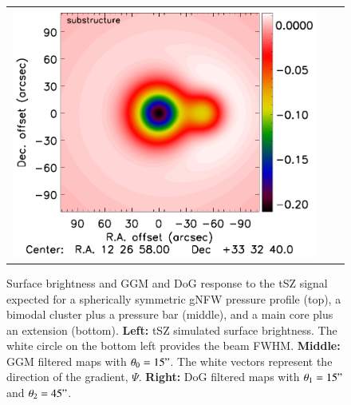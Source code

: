 \documentclass[traditabstract]{aa}
\begin{document}
\begin{figure}[h]
{\begin{tabular}{lll}
\includegraphics[trim=2.3cm 0.7cm 0cm 0cm, clip=true, scale=1]{Figure/DoG_substructure_15_15_45.pdf} 
\end{tabular}}
\caption{\footnotesize{Surface brightness and GGM and DoG response to the tSZ signal expected for a spherically symmetric gNFW pressure profile (top), a bimodal cluster plus a pressure bar (middle), and a main core plus an extension (bottom).
{\bf Left:} tSZ simulated surface brightness. The white circle on the bottom left provides the beam FWHM.
{\bf Middle:} GGM filtered maps with $\theta_0 = 15"$. The white vectors represent the direction of the gradient, $\Psi$. 
{\bf Right:} DoG filtered maps with $\theta_1 = 15"$ and $\theta_2 = 45"$.}}
\label{fig:test_filter_gNFW_and_bimodal}
\end{figure}
\end{document}
